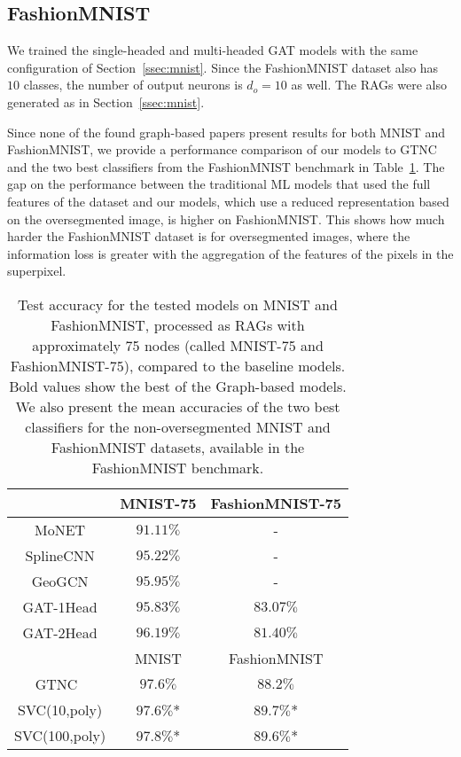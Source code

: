 \documentclass[twocolumn]{article}
\begin{document}
\subsection{FashionMNIST}\label{ssec:fashionmnist}

We trained the single-headed and multi-headed GAT models with the same configuration of Section~\ref{ssec:mnist}. Since the FashionMNIST dataset also has $10$ classes, the number of output neurons is $d_o = 10$ as well. 
The RAGs were also generated as in Section~\ref{ssec:mnist}.

Since none of the found graph-based papers present results for both MNIST and FashionMNIST,
we provide 
a 
performance comparison
of
our models
to GTNC~\cite{sun2020generative} and the two best classifiers from the FashionMNIST benchmark \cite{xiao2017fashionmnist} in Table~\ref{tab:testresults}. The gap on the performance between the traditional ML models that  used the full features of the dataset and our models, which use a reduced representation based on the oversegmented image, is higher on FashionMNIST. This shows how much harder the FashionMNIST dataset is for oversegmented images, where the information loss is greater with the aggregation of the features of the pixels in the superpixel.

\begin{table}[tpb]
    \centering
 \caption{Test accuracy for the tested models on MNIST and FashionMNIST, processed as RAGs with approximately 75 nodes (called MNIST-75 and FashionMNIST-75), compared to the baseline models. Bold values show the best of the Graph-based models. We also present the mean accuracies of the two best classifiers for the non-oversegmented MNIST and FashionMNIST datasets, available in the FashionMNIST benchmark.}
       \begin{tabular}{ccc}
    \toprule
                    & MNIST-75  & FashionMNIST-75 \\
    \midrule
        MoNET \cite{monti2017monet}                      & $91.11\%$ & - \\
        SplineCNN \cite{fey2018splinecnn}                  & $95.22\%$ & - \\
        GeoGCN \cite{spurek2019geogcn}                      & $95.95\%$ & - \\
    \midrule
        GAT-1Head                   & $95.83\%$ & $\mathbf{83.07\%}$ \\
        GAT-2Head                   & $\mathbf{96.19\%}$ & $81.40\%$ \\
    \midrule
                    & MNIST     & FashionMNIST \\
    \midrule
        GTNC~\cite{sun2020generative} & $97.6\%$ & $88.2\%$  \\
        SVC(10,poly)                & $97.6\%$* & $89.7\%$* \\
        SVC(100,poly)               & $97.8\%$* & $89.6\%$* \\
    \bottomrule
    \end{tabular}
    \label{tab:testresults}
\end{table}
\end{document}
